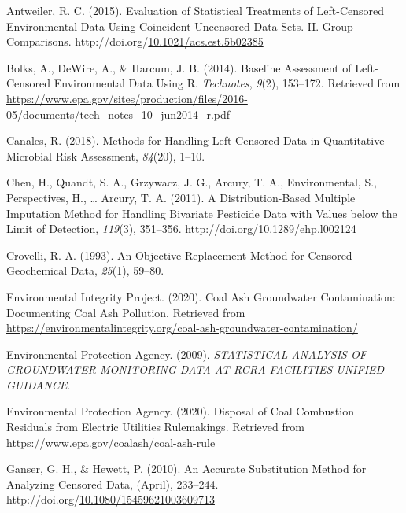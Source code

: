 \documentclass[12pt, twoside]{amherstthesis}
\newenvironment{CSLReferences}%
  {}%
  {\par}
\begin{document}
\noindent

\setlength{\parindent}{-0.20in}
\setlength{\leftskip}{0.20in}
\setlength{\parskip}{8pt}

\hypertarget{refs}{}
\begin{CSLReferences}{1}{0}
\leavevmode\hypertarget{ref-Antweiler2015}{}%
Antweiler, R. C. (2015). {Evaluation of Statistical Treatments of Left-Censored Environmental Data Using Coincident Uncensored Data Sets. II. Group Comparisons}. http://doi.org/\href{https://doi.org/10.1021/acs.est.5b02385}{10.1021/acs.est.5b02385}

\leavevmode\hypertarget{ref-Bolks2014}{}%
Bolks, A., DeWire, A., \& Harcum, J. B. (2014). {Baseline Assessment of Left-Censored Environmental Data Using R}. \emph{Technotes}, \emph{9}(2), 153--172. Retrieved from \url{https://www.epa.gov/sites/production/files/2016-05/documents/tech_notes_10_jun2014_r.pdf}

\leavevmode\hypertarget{ref-Canales2018}{}%
Canales, R. (2018). {Methods for Handling Left-Censored Data in Quantitative Microbial Risk Assessment}, \emph{84}(20), 1--10.

\leavevmode\hypertarget{ref-Chen2011}{}%
Chen, H., Quandt, S. A., Grzywacz, J. G., Arcury, T. A., Environmental, S., Perspectives, H., \ldots{} Arcury, T. A. (2011). {A Distribution-Based Multiple Imputation Method for Handling Bivariate Pesticide Data with Values below the Limit of Detection}, \emph{119}(3), 351--356. http://doi.org/\href{https://doi.org/10.1289/ehp.l002124}{10.1289/ehp.l002124}

\leavevmode\hypertarget{ref-Crovelli1993}{}%
Crovelli, R. A. (1993). {An Objective Replacement Method for Censored Geochemical Data}, \emph{25}(1), 59--80.

\leavevmode\hypertarget{ref-EIP2020}{}%
Environmental Integrity Project. (2020). {Coal Ash Groundwater Contamination: Documenting Coal Ash Pollution}. Retrieved from \url{https://environmentalintegrity.org/coal-ash-groundwater-contamination/}

\leavevmode\hypertarget{ref-EPA2009}{}%
Environmental Protection Agency. (2009). \emph{{STATISTICAL ANALYSIS OF GROUNDWATER MONITORING DATA AT RCRA FACILITIES UNIFIED GUIDANCE}}.

\leavevmode\hypertarget{ref-Car2020}{}%
Environmental Protection Agency. (2020). {Disposal of Coal Combustion Residuals from Electric Utilities Rulemakings}. Retrieved from \url{https://www.epa.gov/coalash/coal-ash-rule}

\leavevmode\hypertarget{ref-Ganser2010}{}%
Ganser, G. H., \& Hewett, P. (2010). {An Accurate Substitution Method for Analyzing Censored Data}, (April), 233--244. http://doi.org/\href{https://doi.org/10.1080/15459621003609713}{10.1080/15459621003609713}


\end{CSLReferences}
\end{document}
